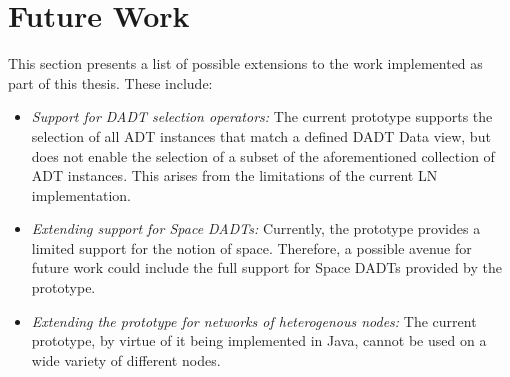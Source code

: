 \section{Future Work}

This section presents a list of possible extensions to the work implemented as
part of this thesis. These include:

\begin{itemize}
  \item \emph{Support for DADT selection operators:} The current prototype
  supports the selection of all ADT instances that match a defined DADT Data
  view, but does not enable the selection of a subset of the aforementioned
  collection of ADT instances. This arises from the limitations of the current
  LN implementation.
  \item \emph{Extending support for Space DADTs:} Currently, the prototype
  provides a limited support for the notion of space. Therefore, a possible
  avenue for future work could include the full support for Space DADTs
  provided by the prototype.
  \item \emph{Extending the prototype for networks of heterogenous nodes:}
  The current prototype, by virtue of it being implemented in Java, cannot be
  used on a wide variety of different nodes. 
\end{itemize}
